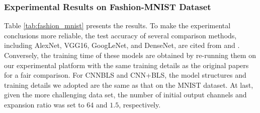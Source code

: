 \documentclass[lettersize,journal]{IEEEtran}
\begin{document}
\subsubsection{Experimental Results on Fashion-MNIST Dataset}
Table \ref{tab:fashion_mnist} presents the results. To make the experimental conclusions more reliable, the test accuracy of several comparison methods, including AlexNet, VGG16, GoogLeNet, and DenseNet, are cited from \cite{meshkini2019analysis} and \cite{duan2019image}. Conversely, the training time of these models are obtained by re-running them on our experimental platform with the same training details as the original papers for a fair comparison. For CNNBLS and CNN+BLS, the model structures and training details we adopted are the same as that on the MNIST dataset. At last, given the more challenging data set, the number of initial output channels and expansion ratio was set to $64$ and $1.5$, respectively.
\end{document}

